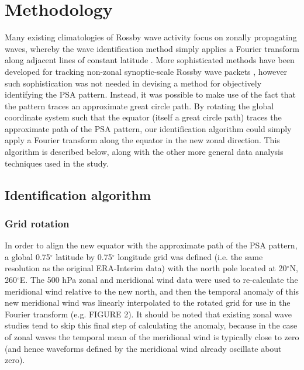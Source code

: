 \section{Methodology}

Many existing climatologies of Rossby wave activity focus on zonally propagating waves, whereby the wave identification method simply applies a Fourier transform along adjacent lines of constant latitude \citep[e.g.][]{Glatt2014,IrvingSimmonds2015}. More sophisticated methods have been developed for tracking non-zonal synoptic-scale Rossby wave packets \citep[e.g.][]{Zimin2006,Souders2014}, however such sophistication was not needed in devising a method for objectively identifying the PSA pattern. Instead, it was possible to make use of the fact that the pattern traces an approximate great circle path. By rotating the global coordinate system such that the equator (itself a great circle path) traces the approximate path of the PSA pattern, our identification algorithm could simply apply a Fourier transform along the equator in the new zonal direction. This algorithm is described below, along with the other more general data analysis techniques used in the study.

\subsection{Identification algorithm}

\subsubsection{Grid rotation}

In order to align the new equator with the approximate path of the PSA pattern, a global 0.75$^{\circ}$ latitude by 0.75$^{\circ}$ longitude grid was defined (i.e. the same resolution as the original ERA-Interim data) with the north pole located at 20$^{\circ}$N, 260$^{\circ}$E. The 500 hPa zonal and meridional wind data were used to re-calculate the meridional wind relative to the new north, and then the temporal anomaly of this new meridional wind was linearly interpolated to the rotated grid for use in the Fourier transform (e.g. FIGURE 2). It should be noted that existing zonal wave studies \citep[e.g.][]{IrvingSimmonds2015} tend to skip this final step of calculating the anomaly, because in the case of zonal waves the temporal mean of the meridional wind is typically close to zero (and hence waveforms defined by the meridional wind already oscillate about zero). 

